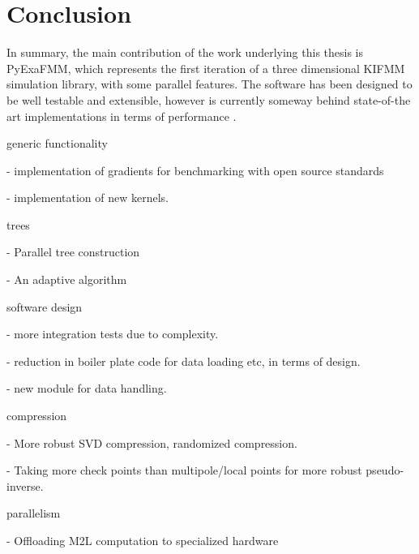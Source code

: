 \chapter{Conclusion}\label{chpt:conclusion}

In summary, the main contribution of the work underlying this thesis is
\gls{PyExaFMM}, which represents the first iteration of a three dimensional
\gls{KIFMM} simulation library, with some parallel features. The software has been
designed to be well testable and extensible, however is currently someway behind
state-of-the art implementations in terms of performance
\cite{exafmm,Malhotra:2015:CCP}.

generic functionality

- implementation of gradients for benchmarking with open source standards

- implementation of new kernels.

trees

- Parallel tree construction

- An adaptive algorithm

software design

- more integration tests due to complexity.

- reduction in boiler plate code for data loading etc, in terms of design.

- new module for data handling.

compression

- More robust SVD compression, randomized compression.

- Taking more check points than multipole/local points for more robust pseudo-inverse.

parallelism

- Offloading M2L computation to specialized hardware
